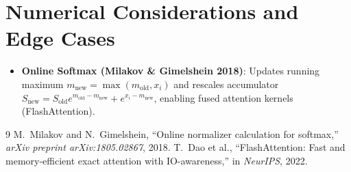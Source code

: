 \documentclass[11pt,a4paper]{article}
\theoremstyle{definition}
\begin{document}
\section{Numerical Considerations and Edge Cases}

\begin{itemize}
    \item \textbf{Online Softmax (Milakov \& Gimelshein 2018)}: Updates running maximum $m_{\text{new}} = \max(m_{\text{old}}, x_i)$ and rescales accumulator $S_{\text{new}} = S_{\text{old}} e^{m_{\text{old}} - m_{\text{new}}} + e^{x_i - m_{\text{new}}}$, enabling fused attention kernels (FlashAttention).
\end{itemize}

\begin{thebibliography}{9}
 M.~Milakov and N.~Gimelshein, ``Online normalizer calculation for softmax,'' \emph{arXiv preprint arXiv:1805.02867}, 2018.
 T.~Dao et al., ``FlashAttention: Fast and memory-efficient exact attention with IO-awareness,'' in \emph{NeurIPS}, 2022.
\end{thebibliography}
\end{document}
